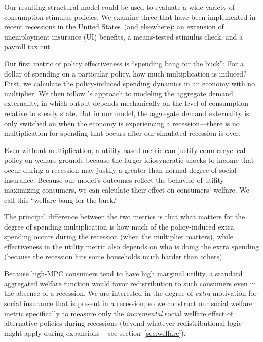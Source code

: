 \documentclass[\econtexRoot/HAFiscal]{subfiles}
\begin{document}
Our resulting structural model could be used to evaluate a wide variety of consumption stimulus policies.  We examine three that have been implemented in recent recessions in the United States\ (and elsewhere): an extension of unemployment insurance (UI) benefits, a means-tested stimulus check, and a payroll tax cut.    

Our first metric of policy effectiveness is ``spending bang for the buck'': For a dollar of spending on a particular policy, how much multiplication is induced?  %
First, we calculate the policy-induced spending dynamics in an economy with no multiplier.  We then follow \cite{kmpHandbook2016}'s approach to modeling the aggregate demand externality, in which output depends mechanically on the level of consumption relative to steady state. But in our model, the aggregate demand externality is only switched on when the economy is experiencing a recession---there is no multiplication for spending that occurs after our simulated recession is over.  %

Even without multiplication, a utility-based metric can justify countercyclical policy on welfare grounds because the larger idiosyncratic shocks to income that occur during a recession may justify a greater-than-normal degree of social insurance.  Because our model's outcomes reflect the behavior of utility-maximizing consumers, we can calculate their effect on consumers' welfare.  We call this ``welfare bang for the buck.''  

The principal difference between the two metrics is that what matters for the degree of spending multiplication is how much of the policy-induced extra spending occurs during the recession (when the multiplier matters), while effectiveness in the utility metric also depends on who is doing the extra spending (because the recession hits some households much harder than others).

Because high-MPC consumers tend to have high marginal utility, a standard aggregated welfare function would favor redistribution to such consumers even in the absence of a recession. We are interested in the degree of \textit{extra} motivation for social insurance that is present in a recession, so we construct our social welfare metric specifically to measure only the \textit{incremental} social welfare effect of alternative policies during recessions (beyond whatever redistributional logic might apply during expansions -- see section~\ref{sec:welfare}).
\end{document}
